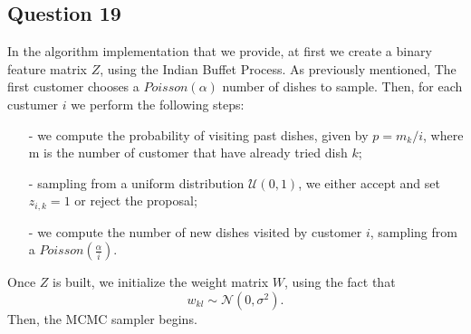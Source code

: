 \documentclass[]{article}
\begin{document}
\subsection*{Question 19}
In the algorithm implementation that we provide, at first we create a binary feature matrix $Z$, using the Indian Buffet Process. As previously mentioned, The first customer chooses a $Poisson(\alpha)$ number of dishes to sample. Then, for each custumer $i$ we perform the following steps:
\begin{enumerate}
	\item [-] we compute the probability of visiting past dishes, given by $p = m_k/i$, where m is the number of customer that have already tried dish $k$;
	\item[-] sampling from a uniform distribution $\mathcal{U}(0,1)$, we either accept and set $z_{i,k}=1$ or reject the proposal;
	\item[-] we compute the number of new dishes visited by customer $i$, sampling from a $Poisson(\frac{\alpha}{i})$.
\end{enumerate}
Once $Z$ is built, we initialize the weight matrix $W$, using the fact that
$$
w_{kl} \sim \mathcal{N}(0,\sigma^2).
$$
Then, the MCMC sampler begins.
\end{document}
